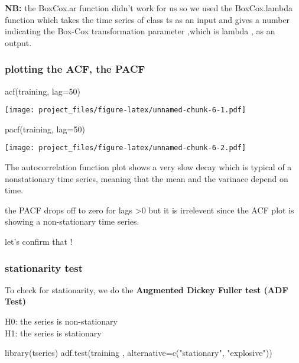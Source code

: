 \documentclass[
]{article}
\newenvironment{Shaded}{\begin{snugshade}}{\end{snugshade}}
\newcommand{\AttributeTok}[1]{\textcolor[rgb]{0.77,0.63,0.00}{#1}}
\newcommand{\DecValTok}[1]{\textcolor[rgb]{0.00,0.00,0.81}{#1}}
\newcommand{\FunctionTok}[1]{\textcolor[rgb]{0.00,0.00,0.00}{#1}}
\newcommand{\NormalTok}[1]{#1}
\newcommand{\StringTok}[1]{\textcolor[rgb]{0.31,0.60,0.02}{#1}}
\begin{document}
\textbf{NB:} the BoxCox.ar function didn't work for us so we used the
BoxCox.lambda function which takes the time series of class ts as an
input and gives a number indicating the Box-Cox transformation parameter
,which is lambda , as an output.

\hypertarget{plotting-the-acf-the-pacf}{%
\subsubsection{plotting the ACF, the
PACF}\label{plotting-the-acf-the-pacf}}

\begin{Shaded}
\begin{Highlighting}[]
\FunctionTok{acf}\NormalTok{(training, }\AttributeTok{lag=}\DecValTok{50}\NormalTok{)}
\end{Highlighting}
\end{Shaded}

\texttt{[image: project\_files/figure-latex/unnamed-chunk-6-1.pdf]}

\begin{Shaded}
\begin{Highlighting}[]
\FunctionTok{pacf}\NormalTok{(training, }\AttributeTok{lag=}\DecValTok{50}\NormalTok{)}
\end{Highlighting}
\end{Shaded}

\texttt{[image: project\_files/figure-latex/unnamed-chunk-6-2.pdf]}

The autocorrelation function plot shows a very slow decay which is
typical of a nonstationary time series, meaning that the mean and the
varinace depend on time.

the PACF drops off to zero for lags \textgreater0 but it is irrelevent
since the ACF plot is showing a non-stationary time series.

let's confirm that !

\hypertarget{stationarity-test}{%
\subsubsection{stationarity test}\label{stationarity-test}}

To check for stationarity, we do the \textbf{Augmented Dickey Fuller
test (ADF Test)}

H0: the series is non-stationary\\
H1: the series is stationary

\begin{Shaded}
\begin{Highlighting}[]
\FunctionTok{library}\NormalTok{(tseries)}
\FunctionTok{adf.test}\NormalTok{(training , }\AttributeTok{alternative=}\FunctionTok{c}\NormalTok{(}\StringTok{"stationary"}\NormalTok{, }\StringTok{"explosive"}\NormalTok{))}
\end{Highlighting}
\end{Shaded}
\end{document}
